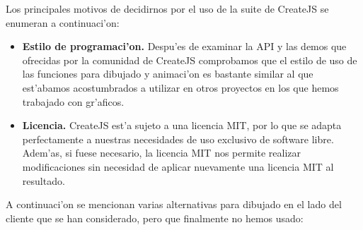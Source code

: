 Los principales motivos de decidirnos por el uso de la suite de CreateJS se enumeran a continuaci'on:

\begin{itemize}
\item \textbf{Estilo de programaci'on.} Despu'es de examinar la API y las demos que ofrecidas por la 
comunidad de CreateJS comprobamos que el estilo de uso de las funciones para dibujado y animaci'on
es bastante similar al que est'abamos acostumbrados a utilizar en otros proyectos en los que 
hemos trabajado con gr'aficos.
\item \textbf{Licencia.} CreateJS est'a sujeto a una licencia MIT, por lo que se adapta perfectamente a 
nuestras necesidades de uso exclusivo de software libre. Adem'as, si fuese necesario, la licencia
MIT nos permite realizar modificaciones sin necesidad de aplicar nuevamente una licencia MIT al 
resultado.
\end{itemize}

A continuaci'on se mencionan varias alternativas para dibujado en el lado del cliente que se han
considerado, pero que finalmente no hemos usado:

